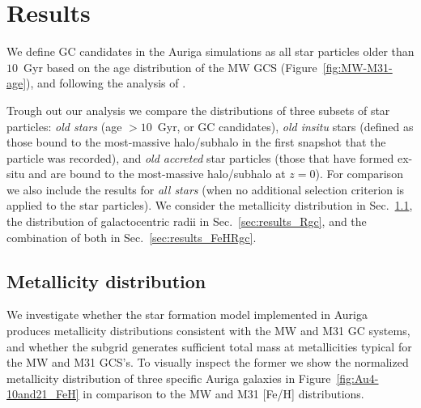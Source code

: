 \documentclass[a4paper,fleqn,usenatbib]{mnras}
\begin{document}
\section{Results}
\label{sec:results}
We define GC candidates in the Auriga simulations as all star particles older
than $10$~Gyr based on the age distribution of the MW GCS (Figure~\ref{fig:MW-M31-age}),
and following the analysis of \citet{2017MNRAS.465.3622R}.

Trough out our analysis we compare the distributions of three subsets of star
particles: \emph{old stars} (age $>10$~Gyr, or GC candidates), \emph{old insitu}
stars (defined as those bound to the most-massive halo/subhalo in the first
snapshot that the particle was recorded), and \emph{old accreted} star particles
(those that have formed ex-situ and are bound to the most-massive halo/subhalo
at $z=0$). For comparison we also include the results for \emph{all stars} (when
no additional selection criterion is applied to the star particles). We consider
the metallicity distribution in Sec.~\ref{sec:results_FeH}, the distribution of
galactocentric radii in Sec.~\ref{sec:results_Rgc}, and the combination of both
in Sec.~\ref{sec:results_FeHRgc}.


\subsection{Metallicity distribution}
\label{sec:results_FeH}
We investigate whether the star formation model implemented in Auriga produces
metallicity distributions consistent with the MW and M31 GC systems, and whether
the subgrid generates sufficient total mass at metallicities typical for the
MW and M31 GCS's. To visually inspect the former we show the normalized metallicity 
distribution of three specific Auriga galaxies in Figure~\ref{fig:Au4-10and21_FeH}
in comparison to the MW and M31 [Fe/H] distributions.
\end{document}
